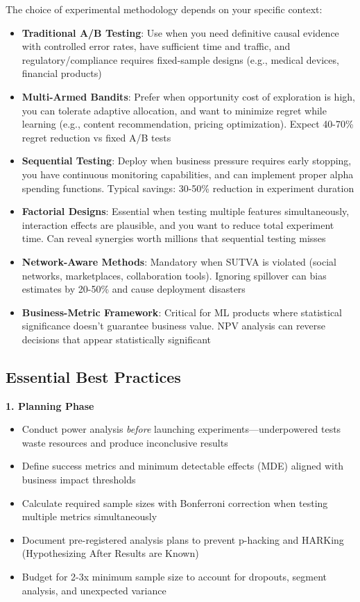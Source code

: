 The choice of experimental methodology depends on your specific context:

\begin{itemize}
    \item \textbf{Traditional A/B Testing}: Use when you need definitive causal evidence with controlled error rates, have sufficient time and traffic, and regulatory/compliance requires fixed-sample designs (e.g., medical devices, financial products)

    \item \textbf{Multi-Armed Bandits}: Prefer when opportunity cost of exploration is high, you can tolerate adaptive allocation, and want to minimize regret while learning (e.g., content recommendation, pricing optimization). Expect 40-70\% regret reduction vs fixed A/B tests

    \item \textbf{Sequential Testing}: Deploy when business pressure requires early stopping, you have continuous monitoring capabilities, and can implement proper alpha spending functions. Typical savings: 30-50\% reduction in experiment duration

    \item \textbf{Factorial Designs}: Essential when testing multiple features simultaneously, interaction effects are plausible, and you want to reduce total experiment time. Can reveal synergies worth millions that sequential testing misses

    \item \textbf{Network-Aware Methods}: Mandatory when SUTVA is violated (social networks, marketplaces, collaboration tools). Ignoring spillover can bias estimates by 20-50\% and cause deployment disasters

    \item \textbf{Business-Metric Framework}: Critical for ML products where statistical significance doesn't guarantee business value. NPV analysis can reverse decisions that appear statistically significant
\end{itemize}

\subsection{Essential Best Practices}

\textbf{1. Planning Phase}
\begin{itemize}
    \item Conduct power analysis \textit{before} launching experiments---underpowered tests waste resources and produce inconclusive results
    \item Define success metrics and minimum detectable effects (MDE) aligned with business impact thresholds
    \item Calculate required sample sizes with Bonferroni correction when testing multiple metrics simultaneously
    \item Document pre-registered analysis plans to prevent p-hacking and HARKing (Hypothesizing After Results are Known)
    \item Budget for 2-3x minimum sample size to account for dropouts, segment analysis, and unexpected variance
\end{itemize}

